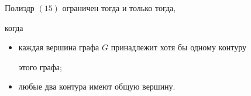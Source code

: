 \begin{thm}


Полиэдр $(15)$ ограничен тогда и только тогда,


когда


\begin{itemize}


\item[а)] каждая вершина графа $G$ принадлежит хотя бы одному контуру


этого графа;


\item[б)] любые два контура имеют общую вершину.


\end{itemize}


\end{thm}





